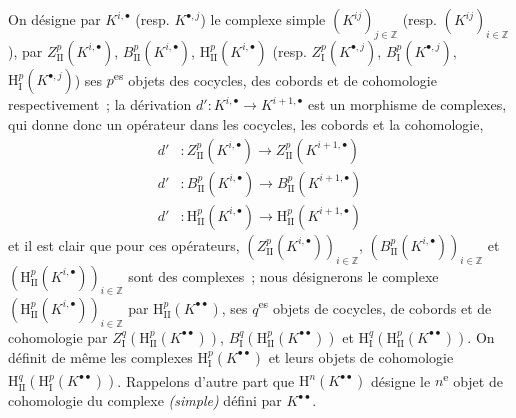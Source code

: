 \begin{env}[11.3.1]
On désigne par $K^{i,\bullet}$ (resp. $K^{\bullet,j}$) le complexe simple
$(K^{ij})_{j\in\mathbb Z}$ (resp. $(K^{ij})_{i\in\mathbb Z}$), par
$Z_{\mathrm{II}}^p(K^{i,\bullet})$, $B_{\mathrm{II}}^p(K^{i,\bullet})$,
$\mathrm H_{\mathrm{II}}^p(K^{i,\bullet})$ (resp.
$Z_{\mathrm I}^p(K^{\bullet,j})$, $B_{\mathrm I}^p(K^{\bullet,j})$,
$\mathrm H_{\mathrm I}^p(K^{\bullet,j})$) ses $p$\textsuperscript{es} objets des cocycles,
des cobords et de cohomologie respectivement~; la dérivation
$d':K^{i,\bullet}\to K^{i+1,\bullet}$ est un morphisme de complexes, qui
donne donc un opérateur dans les cocycles, les cobords et la cohomologie,
\[
\begin{aligned}
  d'&:Z_{\mathrm{II}}^p(K^{i,\bullet})
      \longrightarrow Z_{\mathrm{II}}^p(K^{i+1,\bullet})\\
  d'&:B_{\mathrm{II}}^p(K^{i,\bullet})
      \longrightarrow B_{\mathrm{II}}^p(K^{i+1,\bullet})\\
  d'&:\mathrm H_{\mathrm{II}}^p(K^{i,\bullet})
      \longrightarrow \mathrm H_{\mathrm{II}}^p(K^{i+1,\bullet})
\end{aligned}
\]
et il est clair que pour ces opérateurs,
$(Z_{\mathrm{II}}^p(K^{i,\bullet}))_{i\in\mathbb Z}$,
$(B_{\mathrm{II}}^p(K^{i,\bullet}))_{i\in\mathbb Z}$ et
$(\mathrm H_{\mathrm{II}}^p(K^{i,\bullet}))_{i\in\mathbb Z}$ sont des
complexes~; nous désignerons le complexe
$(\mathrm H_{\mathrm{II}}^p(K^{i,\bullet}))_{i\in\mathbb Z}$ par
$\mathrm H_{\mathrm{II}}^p(K^{\bullet\bullet})$, ses $q$\textsuperscript{es} objets de
cocycles, de cobords et de cohomologie par
$Z_{\mathrm I}^q(\mathrm H_{\mathrm{II}}^p(K^{\bullet\bullet}))$,
$B_{\mathrm I}^q(\mathrm H_{\mathrm{II}}^p(K^{\bullet\bullet}))$ et
$\mathrm H_{\mathrm I}^q(\mathrm H_{\mathrm{II}}^p(K^{\bullet\bullet}))$.
On définit de même les complexes
$\mathrm H_{\mathrm I}^p(K^{\bullet\bullet})$ et leurs objets de cohomologie
$\mathrm H_{\mathrm{II}}^q(\mathrm H_{\mathrm I}^p(K^{\bullet\bullet}))$.
Rappelons d'autre part que $\mathrm H^n(K^{\bullet\bullet})$ désigne le
$n$\textsuperscript{e} objet de cohomologie du complexe \emph{(simple)} défini par
$K^{\bullet\bullet}$.
\end{env}

